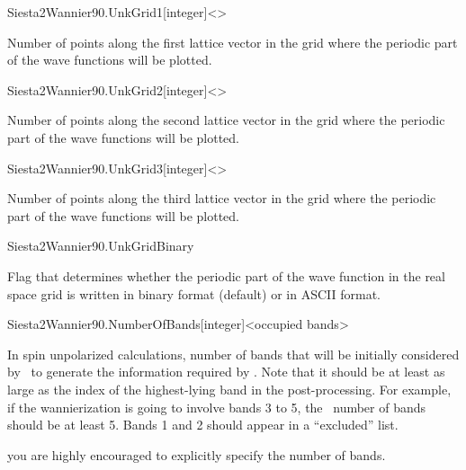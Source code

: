   \begin{fdfentry}{Siesta2Wannier90.UnkGrid1}[integer]<>

    Number of points along the first lattice vector in the grid where
    the periodic part of the wave functions will be plotted.

  \end{fdfentry}

  \begin{fdfentry}{Siesta2Wannier90.UnkGrid2}[integer]<>

    Number of points along the second lattice vector in the grid where
    the periodic part of the wave functions will be plotted.

  \end{fdfentry}

  \begin{fdfentry}{Siesta2Wannier90.UnkGrid3}[integer]<>

    Number of points along the third lattice vector in the grid where
    the periodic part of the wave functions will be plotted.

  \end{fdfentry}


  \begin{fdflogicalT}{Siesta2Wannier90.UnkGridBinary}

    Flag that determines whether the periodic part of the wave function
    in the real space grid is written in binary format (default) or in
    ASCII format.

  \end{fdflogicalT}

  \begin{fdfentry}{Siesta2Wannier90.NumberOfBands}[integer]<occupied bands>

    In spin unpolarized calculations, number of bands that will be
    initially considered by \siesta\ to generate the information
    required by . Note that it should be at least as
    large as the index of the highest-lying band in the
     post-processing. For example, if the
    wannierization is going to involve bands 3 to 5, the \siesta\ number
    of bands should be at least 5. Bands 1 and 2 should appear in a
    ``excluded'' list.

    \note you are highly encouraged to explicitly specify the number of
    bands.

  \end{fdfentry}

